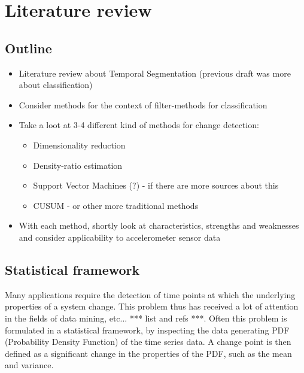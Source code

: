 
\chapter{Literature review}

\label{Chapter2} %


\section{Outline}
\begin{itemize}
  \item Literature review about Temporal Segmentation (previous draft was more about classification)
  \item Consider methods for the context of filter-methods for classification
  \item Take a loot at 3-4 different kind of methods for change detection:
    \begin{itemize}
      \item Dimensionality reduction
      \item Density-ratio estimation
      \item Support Vector Machines (?) - if there are more sources about this
      \item CUSUM - or other more traditional methods
    \end{itemize}
  \item With each method, shortly look at characteristics, strengths and weaknesses and consider applicability to accelerometer sensor data
\end{itemize}



\section{Statistical framework}
Many applications require the detection of time points at which the underlying properties of a system change.
This problem thus has received a lot of attention in the fields of data mining, etc... *** list and refs ***.
Often this problem is formulated in a statistical framework, by inspecting the data generating PDF (Probability Density Function) of the time series data.
A change point is then defined as a significant change in the properties of the PDF, such as the mean and variance.

